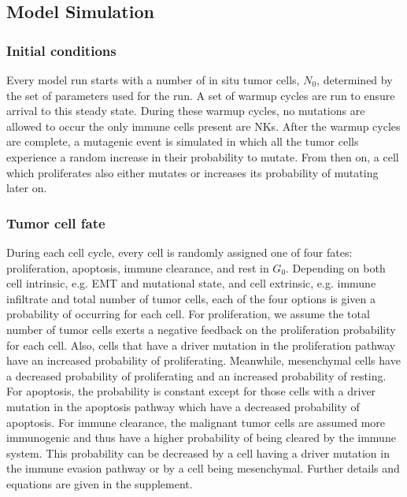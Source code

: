 \documentclass[11pt]{article}
\begin{document}
\subsection{Model Simulation}

\subsubsection{Initial conditions} 
Every model run starts with a number of in situ tumor cells, $N_0$, determined by the set of parameters used for the run.
A set of warmup cycles are run to ensure arrival to this steady state.
During these warmup cycles, no mutations are allowed to occur the only immune cells present are NKs.
After the warmup cycles are complete, a mutagenic event is simulated in which all the tumor cells experience a random increase in their probability to mutate.
From then on, a cell which proliferates also either mutates or increases its probability of mutating later on.

\subsubsection{Tumor cell fate}
During each cell cycle, every cell is randomly assigned one of four fates: proliferation, apoptosis, immune clearance, and rest in $G_0$.
Depending on both cell intrinsic, e.g. EMT and mutational state, and cell extrinsic, e.g. immune infiltrate and total number of tumor cells, each of the four options is given a probability of occurring for each cell.
For proliferation, we assume the total number of tumor cells exerts a negative feedback on the proliferation probability for each cell.
Also, cells that have a driver mutation in the proliferation pathway have an increased probability of proliferating.
Meanwhile, mesenchymal cells have a decreased probability of proliferating and an increased probability of resting.
For apoptosis, the probability is constant except for those cells with a driver mutation in the apoptosis pathway which have a decreased probability of apoptosis.
For immune clearance, the malignant tumor cells are assumed more immunogenic and thus have a higher probability of being cleared by the immune system.
This probability can be decreased by a cell having a driver mutation in the immune evasion pathway or by a cell being mesenchymal.
Further details and equations are given in the supplement.
\end{document}
